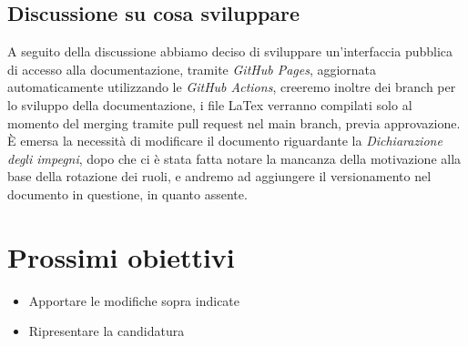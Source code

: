 \subsection{Discussione su cosa sviluppare}
A seguito della discussione abbiamo deciso di sviluppare un’interfaccia pubblica di accesso alla documentazione, tramite \textit{GitHub Pages}, aggiornata automaticamente utilizzando le \textit{GitHub Actions}, creeremo inoltre dei branch per lo sviluppo della documentazione, i file LaTex verranno compilati solo al momento del merging tramite pull request nel main branch, previa approvazione.\\
È emersa la necessità di modificare il documento riguardante la \textit{Dichiarazione degli impegni}, dopo che ci è stata fatta notare la mancanza della motivazione alla base della rotazione dei ruoli, e andremo ad aggiungere il versionamento nel documento in questione, in quanto assente.

\section{Prossimi obiettivi}
   \begin{itemize}
        \item Apportare le modifiche sopra indicate
        \item Ripresentare la candidatura
    \end{itemize}
